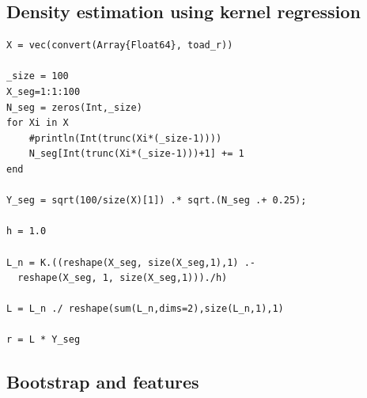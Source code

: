 \documentclass{article}
\begin{document}
\subsection{Density estimation using kernel regression}

\begin{lstlisting}
X = vec(convert(Array{Float64}, toad_r))

_size = 100
X_seg=1:1:100
N_seg = zeros(Int,_size)
for Xi in X
    #println(Int(trunc(Xi*(_size-1))))
    N_seg[Int(trunc(Xi*(_size-1)))+1] += 1
end

Y_seg = sqrt(100/size(X)[1]) .* sqrt.(N_seg .+ 0.25);

h = 1.0

L_n = K.((reshape(X_seg, size(X_seg,1),1) .- 
  reshape(X_seg, 1, size(X_seg,1)))./h)

L = L_n ./ reshape(sum(L_n,dims=2),size(L_n,1),1)

r = L * Y_seg

\end{lstlisting}

\subsection{Bootstrap and features}
\end{document}
